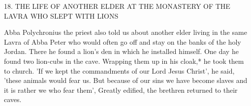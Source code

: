 18. THE LIFE OF ANOTHER ELDER AT THE
MONASTERY OF THE LAVRA
WHO SLEPT WITH LIONS

Abba Polychronius the priest also told us about another elder living
in the same Lavra of Abba Peter who would often go off and stay
on the banks of the holy Jordan. There he found a lion's den in
which he installed himself. One day he found two lion-cubs in the
cave. Wrapping them up in his cloak,* he took them to church. 'If
we kept the commandments of our Lord Jesus Christ', he said,
'these animals would fear us. But because of our sins we have
become slaves and it is rather we who fear them', Greatly edified,
the brethren returned to their caves.

